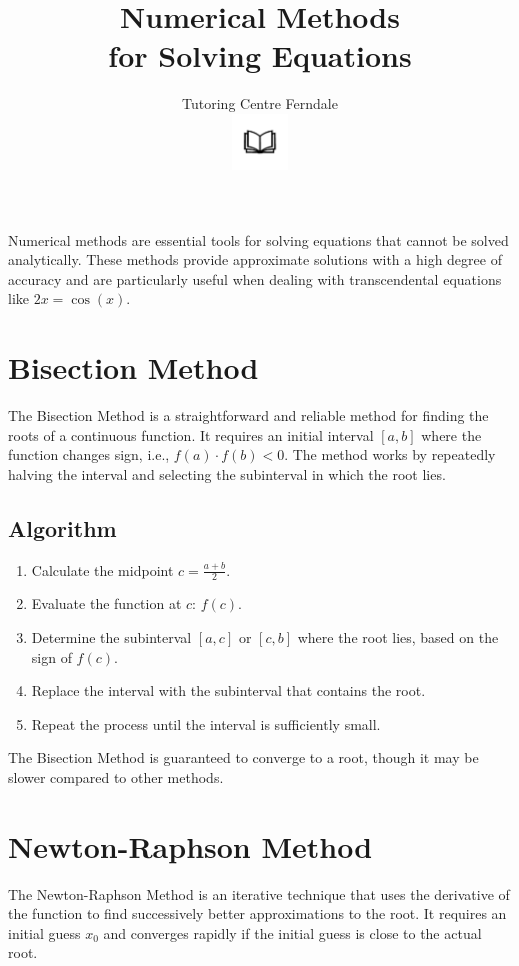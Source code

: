 \documentclass[12pt]{article}
\title{\textbf{Numerical Methods\\for Solving Equations}}
\author{Tutoring Centre Ferndale\\\includegraphics[width=4em]{ApS_logo.png}}
\date{}
\begin{document}
\maketitle

Numerical methods are essential tools for solving equations that cannot be solved analytically. These methods provide approximate solutions with a high degree of accuracy and are particularly useful when dealing with transcendental equations like \( 2x = \cos(x) \).

\section*{Bisection Method}

The Bisection Method is a straightforward and reliable method for finding the roots of a continuous function. It requires an initial interval \([a, b]\) where the function changes sign, i.e., \( f(a) \cdot f(b) < 0 \). The method works by repeatedly halving the interval and selecting the subinterval in which the root lies.

\subsection*{Algorithm}
\begin{enumerate}
    \item Calculate the midpoint \( c = \frac{a + b}{2} \).
    \item Evaluate the function at \( c \): \( f(c) \).
    \item Determine the subinterval \([a, c]\) or \([c, b]\) where the root lies, based on the sign of \( f(c) \).
    \item Replace the interval with the subinterval that contains the root.
    \item Repeat the process until the interval is sufficiently small.
\end{enumerate}

The Bisection Method is guaranteed to converge to a root, though it may be slower compared to other methods.

\section*{Newton-Raphson Method}

The Newton-Raphson Method is an iterative technique that uses the derivative of the function to find successively better approximations to the root. It requires an initial guess \( x_0 \) and converges rapidly if the initial guess is close to the actual root.
\end{document}
